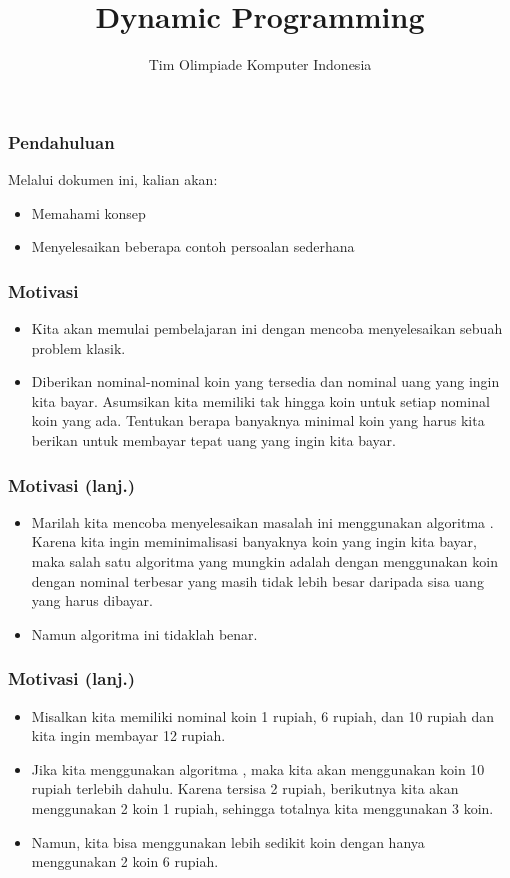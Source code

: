 

\title{Dynamic Programming}
\author{Tim Olimpiade Komputer Indonesia}
\date{}



\begin{frame}
\titlepage
\end{frame}

\begin{frame}
\frametitle{Pendahuluan}
Melalui dokumen ini, kalian akan:
\begin{itemize}
  \item Memahami konsep 
  \item Menyelesaikan beberapa contoh persoalan  sederhana
\end{itemize}
\end{frame}

\begin{frame}
\frametitle{Motivasi}
\begin{itemize}
  \item Kita akan memulai pembelajaran ini dengan mencoba menyelesaikan sebuah problem klasik.
  \item Diberikan nominal-nominal koin yang tersedia dan nominal uang yang ingin kita bayar. Asumsikan kita memiliki tak hingga koin untuk setiap nominal koin yang ada. Tentukan berapa banyaknya minimal koin yang harus kita berikan untuk membayar tepat uang yang ingin kita bayar.
\end{itemize}
\end{frame}

\begin{frame}
\frametitle{Motivasi (lanj.)}
\begin{itemize}
  \item Marilah kita mencoba menyelesaikan masalah ini menggunakan algoritma . Karena kita ingin meminimalisasi banyaknya koin yang ingin kita bayar, maka salah satu algoritma  yang mungkin adalah dengan menggunakan koin dengan nominal terbesar yang masih tidak lebih besar daripada sisa uang yang harus dibayar.
   \item Namun algoritma  ini tidaklah benar.
 \end{itemize}
\end{frame}

\begin{frame}
\frametitle{Motivasi (lanj.)}
\begin{itemize}
  \item Misalkan kita memiliki nominal koin 1 rupiah, 6 rupiah, dan 10 rupiah dan kita ingin membayar 12 rupiah.
  \item Jika kita menggunakan algoritma , maka kita akan menggunakan koin 10 rupiah terlebih dahulu. Karena tersisa 2 rupiah, berikutnya kita akan menggunakan 2 koin 1 rupiah, sehingga totalnya kita menggunakan 3 koin.
   \item Namun, kita bisa menggunakan lebih sedikit koin dengan hanya menggunakan 2 koin 6 rupiah.
 \end{itemize}
\end{frame}

